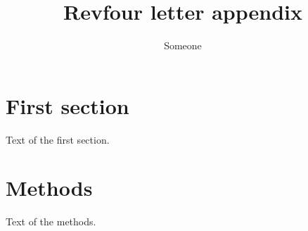 \documentclass[prl]{revtex4}
\begin{document}
\title{Revfour letter appendix}
\author{Someone}
\maketitle
\section{First section}
Text of the first section.
\appendix*
\section{Methods}
Text of the methods.
\end{document}
